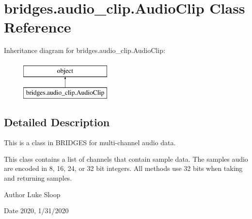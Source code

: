 \hypertarget{classbridges_1_1audio__clip_1_1_audio_clip}{}\section{bridges.\+audio\+\_\+clip.\+Audio\+Clip Class Reference}
\label{classbridges_1_1audio__clip_1_1_audio_clip}
Inheritance diagram for bridges.\+audio\+\_\+clip.\+Audio\+Clip\+:\begin{figure}[H]
\begin{center}
\leavevmode
\includegraphics[height=2.000000cm]{classbridges_1_1audio__clip_1_1_audio_clip}
\end{center}
\end{figure}


\subsection{Detailed Description}
This is a class in B\+R\+I\+D\+G\+ES for multi-\/channel audio data. 

This class contains a list of channels that contain sample data. The samples audio are encoded in 8, 16, 24, or 32 bit integers. All methods use 32 bits when taking and returning samples.

\begin{DoxyAuthor}{Author}
Luke Sloop
\end{DoxyAuthor}
\begin{DoxyDate}{Date}
2020, 1/31/2020 
\end{DoxyDate}
